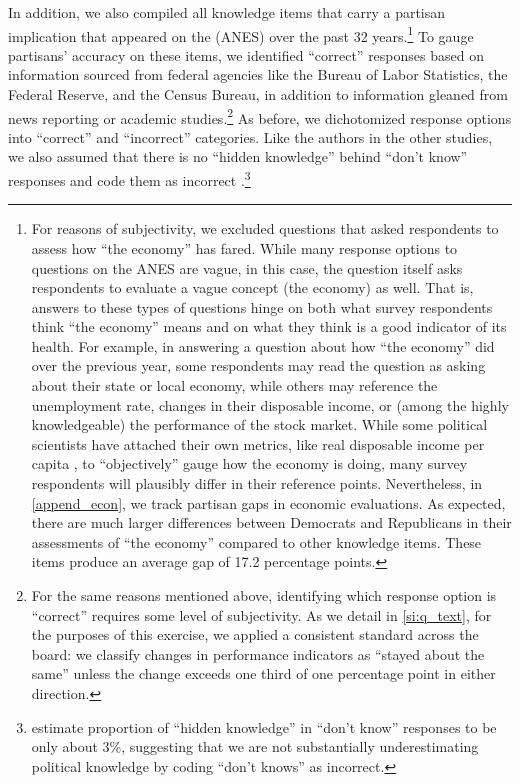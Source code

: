 \documentclass[12pt, letterpaper]{article}
\begin{document}
In addition, we also compiled all knowledge items that carry a partisan implication that appeared on the \citet{anes_gen} (ANES) over the past 32 years.\footnote{For reasons of subjectivity, we excluded questions that asked respondents to assess how ``the economy'' has fared. While many response options to questions on the ANES are vague, in this case, the question itself asks respondents to evaluate a vague concept (the economy) as well. That is, answers to these types of questions hinge on both what survey respondents think ``the economy'' means and on what they think is a good indicator of its health. For example, in answering a question about how ``the economy'' did over the previous year, some respondents may read the question as asking about their state or local economy, while others may reference the unemployment rate, changes in their disposable income, or (among the highly knowledgeable) the performance of the stock market. While some political scientists have attached their own metrics, like real disposable income per capita \citep[e.g.,][]{achen2016democracy,hibbs2000}, to ``objectively'' gauge how the economy is doing, many survey respondents will plausibly differ in their reference points. Nevertheless, in \ref{append_econ}, we track partisan gaps in economic evaluations. As expected, there are much larger differences between Democrats and Republicans in their assessments of ``the economy'' compared to other knowledge items. These items produce an average gap of 17.2 percentage points.}  To gauge partisans' accuracy on these items, we identified ``correct'' responses based on information sourced from federal agencies like the Bureau of Labor Statistics, the Federal Reserve, and the Census Bureau, in addition to information gleaned from news reporting or academic studies.\footnote{For the same reasons mentioned above, identifying which response option is ``correct'' requires some level of subjectivity. As we detail in \ref{si:q_text}, for the purposes of this exercise, we applied a consistent standard across the board: we classify changes in performance indicators as ``stayed about the same'' unless the change exceeds one third of one percentage point in either direction.} As before, we dichotomized response options into ``correct'' and ``incorrect'' categories. Like the authors in the other studies, we also assumed that there is no ``hidden knowledge'' behind ``don't know'' responses and code them as incorrect \citep{luskin2011don}.\footnote{\citet{luskin2011don} estimate proportion of ``hidden knowledge'' in ``don't know'' responses to be only about 3\%, suggesting that we are not substantially underestimating political knowledge by coding ``don't knows'' as incorrect.} 
\end{document}
